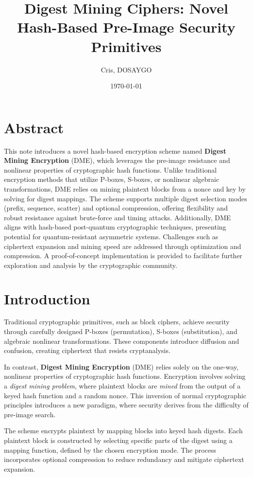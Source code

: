 \documentclass[11pt,a4paper]{article}
\title{Digest Mining Ciphers: Novel Hash-Based Pre-Image Security Primitives}
\author{Cris, DOSAYGO}
\date{\today}
\begin{document}
\maketitle

\section*{Abstract}
This note introduces a novel hash-based encryption scheme named \textbf{Digest Mining Encryption} (DME), which leverages the pre-image resistance and nonlinear properties of cryptographic hash functions. Unlike traditional encryption methods that utilize P-boxes, S-boxes, or nonlinear algebraic transformations, DME relies on mining plaintext blocks from a nonce and key by solving for digest mappings. The scheme supports multiple digest selection modes (prefix, sequence, scatter) and optional compression, offering flexibility and robust resistance against brute-force and timing attacks. Additionally, DME aligns with hash-based post-quantum cryptographic techniques, presenting potential for quantum-resistant asymmetric systems. Challenges such as ciphertext expansion and mining speed are addressed through optimization and compression. A proof-of-concept implementation is provided to facilitate further exploration and analysis by the cryptographic community.

\section*{Introduction}
Traditional cryptographic primitives, such as block ciphers, achieve security through carefully designed P-boxes (permutation), S-boxes (substitution), and algebraic nonlinear transformations. These components introduce diffusion and confusion, creating ciphertext that resists cryptanalysis.

In contrast, \textbf{Digest Mining Encryption} (DME) relies solely on the one-way, nonlinear properties of cryptographic hash functions. Encryption involves solving a \textit{digest mining problem}, where plaintext blocks are \textit{mined} from the output of a keyed hash function and a random nonce. This inversion of normal cryptographic principles introduces a new paradigm, where security derives from the difficulty of pre-image search.

The scheme encrypts plaintext by mapping blocks into keyed hash digests. Each plaintext block is constructed by selecting specific parts of the digest using a mapping function, defined by the chosen encryption mode. The process incorporates optional compression to reduce redundancy and mitigate ciphertext expansion.
\end{document}
